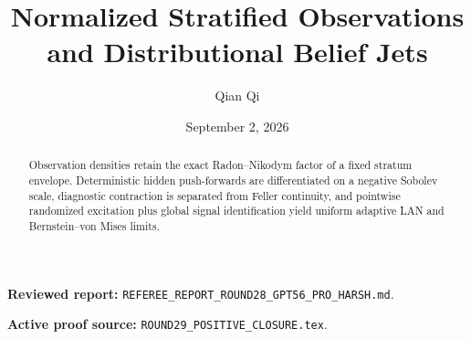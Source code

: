 \documentclass[11pt,reqno]{amsart}
\title[C1 Round 29 revision]{Normalized Stratified Observations and Distributional Belief Jets}
\author{Qian Qi}
\date{September 2, 2026}
\begin{document}
\begin{abstract}Observation densities retain the exact Radon--Nikodym factor of a fixed stratum envelope. Deterministic hidden push-forwards are differentiated on a negative Sobolev scale, diagnostic contraction is separated from Feller continuity, and pointwise randomized excitation plus global signal identification yield uniform adaptive LAN and Bernstein--von Mises limits.\end{abstract}
\maketitle
\noindent\textbf{Reviewed report:} \texttt{REFEREE\_REPORT\_ROUND28\_GPT56\_PRO\_HARSH.md}.\par
\noindent\textbf{Active proof source:} \texttt{ROUND29\_POSITIVE\_CLOSURE.tex}.\par

\end{document}

